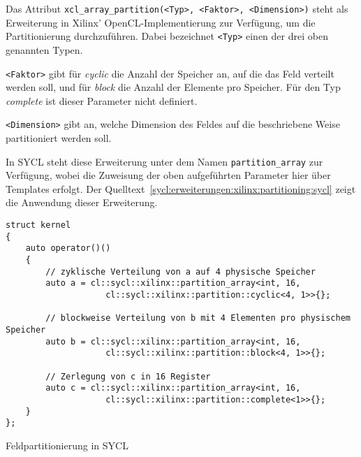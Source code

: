 Das Attribut \texttt{xcl\_array\_partition(<Typ>, <Faktor>, <Dimension>)} steht
als Erweiterung in Xilinx' OpenCL-Implementierung zur Verfügung, um die
Partitionierung durchzuführen. Dabei bezeichnet \texttt{<Typ>} einen der drei
oben genannten Typen. \cite[vgl.][17]{sdxpragma2019}

\texttt{<Faktor>} gibt für \textit{cyclic} die Anzahl der Speicher an, auf die
das Feld verteilt werden soll, und für \textit{block} die Anzahl der Elemente
pro Speicher. Für den Typ \textit{complete} ist dieser Parameter nicht
definiert. \cite[vgl.][17]{sdxpragma2019}

\texttt{<Dimension>} gibt an, welche Dimension des Feldes auf die beschriebene
Weise partitioniert werden soll. \cite[vgl.][17]{sdxpragma2019}

In SYCL steht diese Erweiterung unter dem Namen \texttt{partition\_array} zur
Verfügung, wobei die Zuweisung der oben aufgeführten Parameter hier über
Templates erfolgt. Der
Quelltext~\ref{sycl:erweiterungen:xilinx:partitioning:sycl} zeigt die Anwendung
dieser Erweiterung.

\begin{code}
    \begin{verbatim}
struct kernel
{
    auto operator()()
    {
        // zyklische Verteilung von a auf 4 physische Speicher
        auto a = cl::sycl::xilinx::partition_array<int, 16,
                    cl::sycl::xilinx::partition::cyclic<4, 1>>{};

        // blockweise Verteilung von b mit 4 Elementen pro physischem Speicher
        auto b = cl::sycl::xilinx::partition_array<int, 16,
                    cl::sycl::xilinx::partition::block<4, 1>>{};

        // Zerlegung von c in 16 Register
        auto c = cl::sycl::xilinx::partition_array<int, 16,
                    cl::sycl::xilinx::partition::complete<1>>{};
    }
};
    \end{verbatim}
    \caption{Feldpartitionierung in SYCL}
    \label{sycl:erweiterungen:xilinx:partitioning:sycl}
\end{code}
